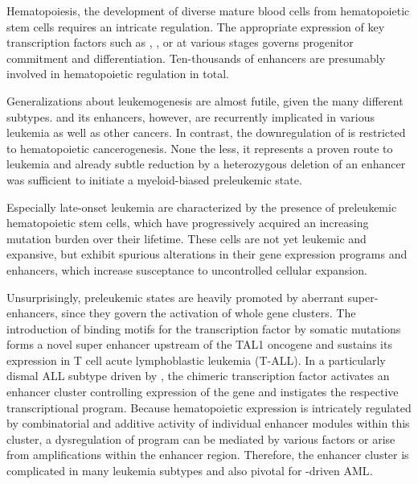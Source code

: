 Hematopoiesis, the development of diverse mature blood cells from hematopoietic stem cells requires an intricate regulation. The appropriate expression of key transcription factors such as , ,  or \tfcebpa at various stages governs progenitor commitment and differentiation. Ten-thousands of enhancers are presumably involved in hematopoietic regulation in total\cite{Lara-Astiaso2014,Ulirsch2019,Bresnick2019}.

Generalizations about leukemogenesis are almost futile, given the many different subtypes.  and its enhancers, however, are recurrently implicated in various leukemia as well as other cancers\cite{Zuber2011,Shi2013,Bahr2018}. In contrast, the downregulation of  is restricted to hematopoietic cancerogenesis. None the less, it represents a proven route to leukemia\cite{Rosenbauer2004,Metcalf2006} and already subtle  reduction by a heterozygous deletion of an enhancer was sufficient to initiate a myeloid-biased preleukemic state\cite{Will2015}.

Especially late-onset leukemia are characterized by the presence of preleukemic hemato\-poietic stem cells, which have progressively acquired an increasing mutation burden over their lifetime. These cells are not yet leukemic and expansive, but exhibit spurious alterations in their gene expression programs and enhancers, which increase susceptance to uncontrolled cellular expansion\cite{Corces2016}. 

Unsurprisingly, preleukemic states are heavily promoted by aberrant super-enhancers, since they govern the activation of whole gene clusters. The introduction of binding motifs for the  transcription factor by somatic mutations forms a novel super enhancer upstream of the TAL1 oncogene and sustains its expression\cite{Mansour2014,Vahedi2015} in T cell acute lymphoblastic leukemia (T-ALL). In a particularly dismal ALL subtype driven by , the chimeric transcription factor activates an enhancer cluster controlling expression of the  gene and instigates the respective transcriptional program\cite{Huang2019}. Because hematopoietic  expression is intricately regulated by combinatorial and additive activity of individual enhancer modules within this cluster\cite{Bahr2018}, a dysregulation of  program can be mediated by various factors or arise from amplifications within the enhancer region\cite{Shi2013}. Therefore, the enhancer cluster is complicated in many leukemia subtypes and also pivotal for \mllafnine-driven AML\cite{Bahr2018}. 

